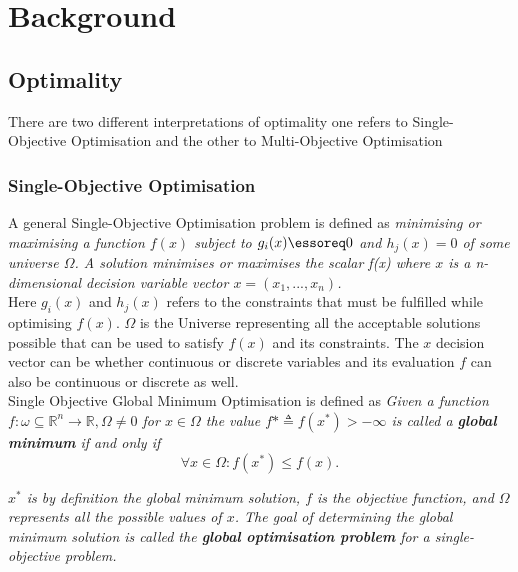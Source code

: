 \chapter{Background}
\label{chapter:chapter02}

\section{Optimality}

There are two different interpretations of optimality one refers to Single-Objective Optimisation and the other to Multi-Objective Optimisation\\

\subsection{Single-Objective Optimisation}

A general Single-Objective Optimisation problem is defined as \textit{minimising or maximising a function $f(x)$ subject to $g_i(x) \essoreq 0$ and $h_j(x) = 0$ of some universe $\Omega$. A solution minimises or maximises the scalar f(x) where $x$ is a n-dimensional decision variable vector $x = (x_1,...,x_n)$.}\\

Here $g_i(x)$ and $h_j(x)$ refers to the constraints that must be fulfilled while optimising $f(x)$. $\Omega$ is the Universe representing all the acceptable solutions possible that can be used to satisfy $f(x)$ and its constraints. The $x$ decision vector can be whether continuous or discrete variables and its evaluation $f$ can also be continuous or discrete as well.\\

Single Objective Global Minimum Optimisation is defined as \textit{Given a function $f: \omega \subseteq \mathbb{R}^n \rightarrow \mathbb{R}, \Omega \neq 0$ for $x \in \Omega$ the value $f* \triangleq f(x^*) > -\infty$ is called a \textbf{global minimum} if and only if}\\

\begin{equation}
    \forall x \in \Omega: f(x^*) \leq f(x).
\end{equation}

\textit{$x^*$ is by definition the global minimum solution, $f$ is the objective function, and $\Omega$ represents all the possible values of $x$. The goal of determining the global minimum solution is called the \textbf{global optimisation problem} for a single-objective problem.}\\

